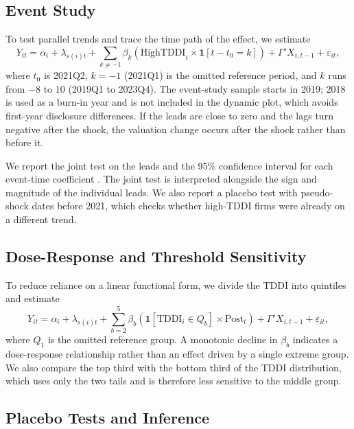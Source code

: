 \subsection{Event Study}

To test parallel trends and trace the time path of the effect, we estimate
\begin{equation}
Y_{it}=\alpha_i+\lambda_{s(i)t}+\sum_{k\neq-1}\beta_k\left(\text{HighTDDI}_i\times\mathbf{1}[t-t_0=k]\right)+\Gamma'X_{i,t-1}+\varepsilon_{it},
\label{eq:event}
\end{equation}
where $t_0$ is 2021Q2, $k=-1$ (2021Q1) is the omitted reference period, and $k$ runs from $-8$ to $10$ (2019Q1 to 2023Q4). The event-study sample starts in 2019; 2018 is used as a burn-in year and is not included in the dynamic plot, which avoids first-year disclosure differences. If the leads are close to zero and the lags turn negative after the shock, the valuation change occurs after the shock rather than before it.

We report the joint test on the leads and the 95\% confidence interval for each event-time coefficient \cite{rambachan2023}. The joint test is interpreted alongside the sign and magnitude of the individual leads. We also report a placebo test with pseudo-shock dates before 2021, which checks whether high-TDDI firms were already on a different trend.

\subsection{Dose-Response and Threshold Sensitivity}

To reduce reliance on a linear functional form, we divide the TDDI into quintiles and estimate
\begin{equation}
Y_{it}=\alpha_i+\lambda_{s(i)t}+\sum_{b=2}^{5}\beta_b\left(\mathbf{1}[\text{TDDI}_i\in Q_b]\times\text{Post}_t\right)+\Gamma'X_{i,t-1}+\varepsilon_{it},
\label{eq:dose}
\end{equation}
where $Q_1$ is the omitted reference group. A monotonic decline in $\beta_b$ indicates a dose-response relationship rather than an effect driven by a single extreme group. We also compare the top third with the bottom third of the TDDI distribution, which uses only the two tails and is therefore less sensitive to the middle group.

\subsection{Placebo Tests and Inference}

